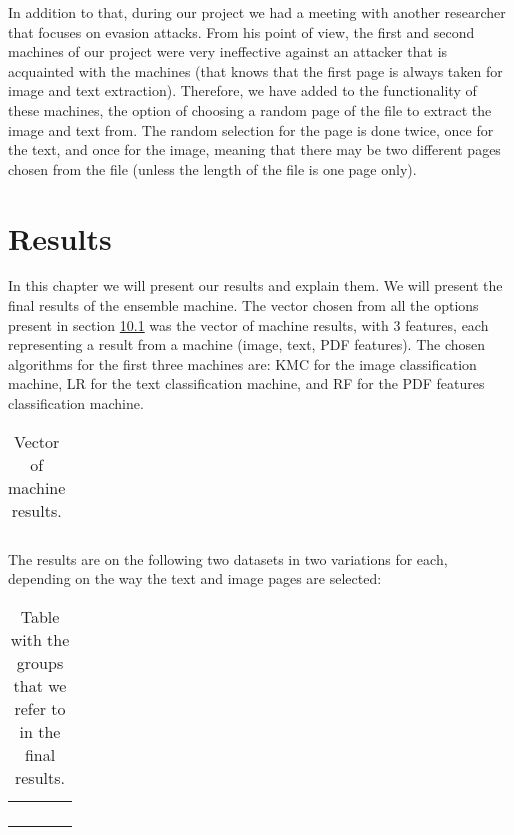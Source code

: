 \documentclass{article}
\begin{document}
\indent In addition to that, during our project we had a meeting with another researcher that focuses on evasion attacks. From his point of view, the first and second machines of our project were very ineffective against an attacker that is acquainted with the machines (that knows that the first page is always taken for image and text extraction). Therefore, we have added to the functionality of these machines, the option of choosing a random page of the file to extract the image and text from. The random selection for the page is done twice, once for the text, and once for the image, meaning that there may be two different pages chosen from the file (unless the length of the file is one page only). 

\section{Results}
\indent In this chapter we will present our results and explain them. We will present the final results of the ensemble machine. The vector chosen from all the options present in section \hyperref[sec:vector5phase]{10.1} was the vector of machine results, with 3 features, each representing a result from a machine (image, text, PDF features). The chosen algorithms for the first three machines are: KMC for the image classification machine, LR for the text classification machine, and RF for the PDF features classification machine.

\begin{table}[htb]
\centering
\begin{tabular}{|M{3.0cm}|M{3.0cm}|M{3.0cm}|}
	\hline
	 &  & \tabularnewline
	\hline
\end{tabular}
\caption{Vector of machine results.}
\end{table}

\indent The results are on the following two datasets in two variations for each, depending on the way the text and image pages are selected:

\begin{table}[htb]
\centering
\begin{tabular}{|M{2.5cm}|M{2.5cm}|M{2.5cm}|M{2.5cm}|}
	\hline
	 &  &  & \tabularnewline
	\hline
	 &  &  & \tabularnewline
	\hline
	 &  &  & \tabularnewline
	\hline
	 &  &  & \tabularnewline
	\hline
	 &  &  & \tabularnewline
	\hline
\end{tabular}
\caption{Table with the groups that we refer to in the final results.}
\end{table}
\end{document}
